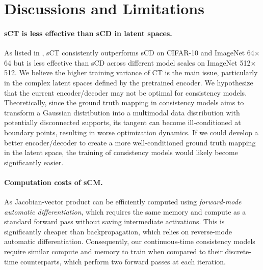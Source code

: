 \section*{Discussions and Limitations}
\paragraph{sCT is less effective than sCD in latent spaces.}
As listed in , sCT consistently outperforms sCD on CIFAR-10 and ImageNet 64$\times$64 but is less effective than sCD across different model scales on ImageNet 512$\times$512. We believe the higher training variance of CT is the main issue, particularly in the complex latent spaces defined by the pretrained encoder. We hypothesize that the current encoder/decoder may not be optimal for consistency models. Theoretically, since the ground truth mapping in consistency models aims to transform a Gaussian distribution into a multimodal data distribution with potentially disconnected supports, its tangent can become ill-conditioned at boundary points, resulting in worse optimization dynamics. If we could develop a better encoder/decoder to create a more well-conditioned ground truth mapping in the latent space, the training of consistency models would likely become significantly easier.

\paragraph{Computation costs of sCM. }
As Jacobian-vector product can be efficiently computed using \textit{forward-mode automatic differentiation}, which requires the same memory and compute as a standard forward pass without saving intermediate activations. This is significantly cheaper than backpropagation, which relies on reverse-mode automatic differentiation. Consequently, our continuous-time consistency models require similar compute and memory to train when compared to their discrete-time counterparts, which perform two forward passes at each iteration.

